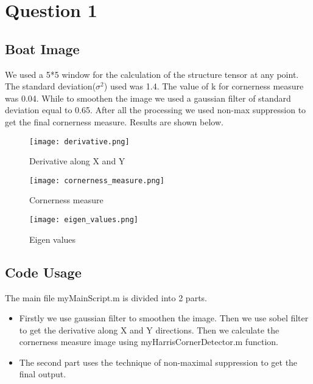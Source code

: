 \documentclass[12pt, a4paper]{article}
\begin{document}
\vspace*{-22pt}
\section*{Question 1}
\subsection*{Boat Image}
We used a 5*5 window for the calculation of the structure tensor at any point. The standard deviation($\sigma^2$) used was 1.4. The value of k for cornerness measure was 0.04. While to smoothen the image we used a gaussian filter of  standard deviation equal to 0.65. After all the processing we used non-max suppression to get the final cornerness measure. Results are shown below. 

\begin{figure}[h!]
  \centering
    \texttt{[image: derivative.png]}
    \caption{Derivative along X and Y}
  \label{fig:1}
\end{figure}

\begin{figure}[h!]
  \centering
    \texttt{[image: cornerness\_measure.png]}
    \caption{Cornerness measure}
  \label{fig:2}
\end{figure}

\begin{figure}[h!]
  \centering
    \texttt{[image: eigen\_values.png]}
    \caption{Eigen values}
  \label{fig:3}
\end{figure}

\subsection*{Code Usage}
The main file myMainScript.m is divided into 2 parts. 
\begin{itemize}
    \item Firstly we use gaussian filter  to smoothen the image. Then we use sobel filter to get the derivative along X and Y directions. Then we calculate the cornerness measure image using myHarrisCornerDetector.m function.
    \item The second part uses the technique of non-maximal suppression to get the final output.
\end{itemize}
\end{document}
